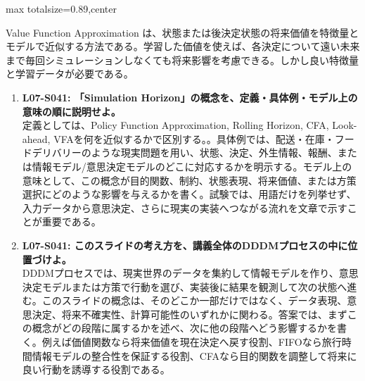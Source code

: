 \begin{minipage}[t]{0.58\textwidth}
\begin{adjustbox}{max totalsize={\textwidth}{0.89\textheight},center}
\begin{minipage}{\textwidth}
Value Function Approximation は、状態または後決定状態の将来価値を特徴量とモデルで近似する方法である。学習した価値を使えば、各決定について遠い未来まで毎回シミュレーションしなくても将来影響を考慮できる。しかし良い特徴量と学習データが必要である。\par{}\begin{enumerate}\item \textbf{L07-S041: 「Simulation Horizon」の概念を、定義・具体例・モデル上の意味の順に説明せよ。}\\定義としては、Policy Function Approximation, Rolling Horizon, CFA, Look-ahead, VFAを何を近似するかで区別する。。具体例では、配送・在庫・フードデリバリーのような現実問題を用い、状態、決定、外生情報、報酬、または情報モデル/意思決定モデルのどこに対応するかを明示する。モデル上の意味として、この概念が目的関数、制約、状態表現、将来価値、または方策選択にどのような影響を与えるかを書く。試験では、用語だけを列挙せず、入力データから意思決定、さらに現実の実装へつながる流れを文章で示すことが重要である。\item \textbf{L07-S041: このスライドの考え方を、講義全体のDDDMプロセスの中に位置づけよ。}\\DDDMプロセスでは、現実世界のデータを集約して情報モデルを作り、意思決定モデルまたは方策で行動を選び、実装後に結果を観測して次の状態へ進む。このスライドの概念は、そのどこか一部だけではなく、データ表現、意思決定、将来不確実性、計算可能性のいずれかに関わる。答案では、まずこの概念がどの段階に属するかを述べ、次に他の段階へどう影響するかを書く。例えば価値関数なら将来価値を現在決定へ戻す役割、FIFOなら旅行時間情報モデルの整合性を保証する役割、CFAなら目的関数を調整して将来に良い行動を誘導する役割である。\end{enumerate}
\end{minipage}
\end{adjustbox}
\end{minipage}


